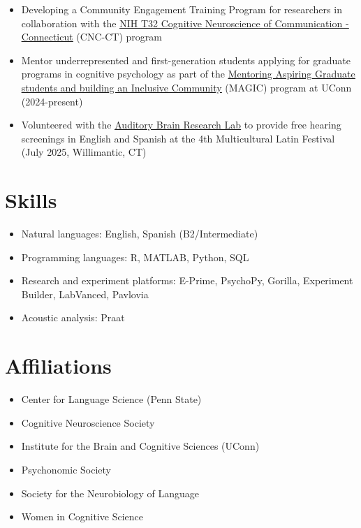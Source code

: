 \documentclass[11pt,a4paper,]{awesome-cv}
\providecommand{\tightlist}{%
	\setlength{\itemsep}{0pt}\setlength{\parskip}{0pt}}
\begin{document}
\begin{itemize}
\tightlist
\item
  Developing a Community Engagement Training Program for researchers in
  collaboration with the
  \href{https://cncct.research.uconn.edu/}{\ul{NIH T32 Cognitive Neuroscience of Communication - Connecticut}}
  (CNC-CT) program
\item
  Mentor underrepresented and first-generation students applying for
  graduate programs in cognitive psychology as part of the
  \href{https://magic.initiative.uconn.edu/}{\ul{Mentoring Aspiring Graduate students and building an Inclusive Community}}
  (MAGIC) program at UConn (2024-present)
\item
  Volunteered with the
  \href{https://skoelab.speech-language-hearing.uconn.edu/}{\ul{Auditory Brain Research Lab}}
  to provide free hearing screenings in English and Spanish at the 4th
  Multicultural Latin Festival (July 2025, Willimantic, CT)
\end{itemize}

\section{Skills}\label{skills}

\begin{itemize}
\tightlist
\item
  Natural languages: English, Spanish (B2/Intermediate)
\item
  Programming languages: R, MATLAB, Python, SQL
\item
  Research and experiment platforms: E-Prime, PsychoPy, Gorilla,
  Experiment Builder, LabVanced, Pavlovia
\item
  Acoustic analysis: Praat
\end{itemize}

\section{Affiliations}\label{affiliations}

\begin{itemize}
\tightlist
\item
  Center for Language Science (Penn State)
\item
  Cognitive Neuroscience Society
\item
  Institute for the Brain and Cognitive Sciences (UConn)
\item
  Psychonomic Society
\item
  Society for the Neurobiology of Language
\item
  Women in Cognitive Science
\end{itemize}


\label{LastPage}~
\end{document}

